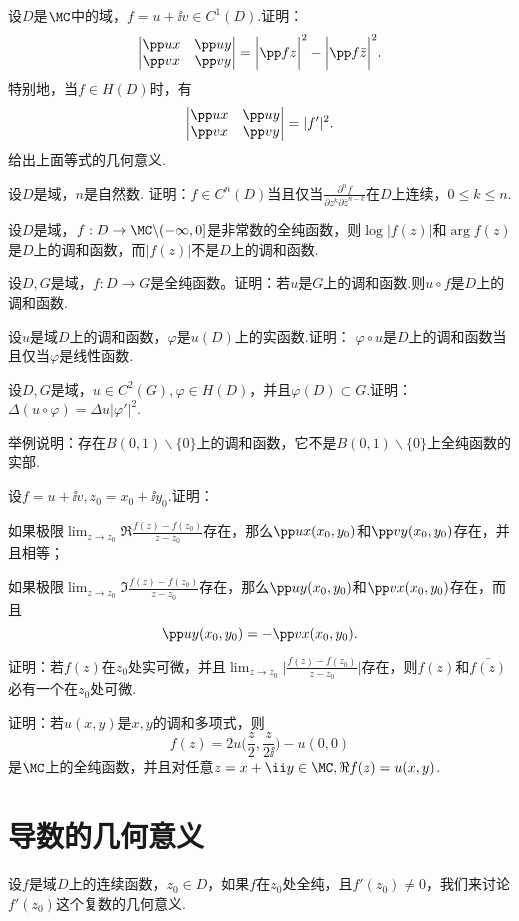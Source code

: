 \begin{xiti}
\item 设$D$是$\MC$中的域，$f=u+\ii v\in C^1(D)$.证明：
\[\begin{vmatrix}
\pp ux&\pp uy\\\pp vx&\pp vy
\end{vmatrix}=\bigg|\pp fz\bigg|^2-\bigg|\pp f{\bar z}\bigg|^2.\]
特别地，当$f\in H(D)$时，有
\[\begin{vmatrix}
\pp ux&\pp uy\\\pp vx&\pp vy
\end{vmatrix}=|f'|^2.\]
给出上面等式的几何意义.
\item 设$D$是域，$n$是自然数. 证明：$f\in C^n(D)$当且仅当$\frac{\partial^nf}{\partial z^k\partial\bar z^{n-k}}$在$D$上连续，$0\le k\le n$.
\item 设$D$是域，$f:D\to\MC\backslash(-\infty,0]$是非常数的全纯函数，则$\log |f(z)|$和$\arg f(z)$是$D$上的调和函数，而$|f(z)|$不是$D$上的调和函数.
\item 设$D,G$是域，$f:D\to G$是全纯函数。证明：若$u$是$G$上的调和函数.则$u\circ f$是$D$上的调和函数.
\item 设$u$是域$D$上的调和函数，$\varphi$是$u(D)$上的实函数.证明：
$\varphi\circ u$是$D$上的调和函数当且仅当$\varphi$是线性函数.
\item 设$D,G$是域，$u\in C^2(G),\varphi\in H(D)$，并且$\varphi(D)\subset G$.证明：$\Delta (u\circ \varphi)=\Delta u|\varphi'|^2$.
\item 举例说明：存在$B(0,1)\backslash\{0\}$上的调和函数，它不是$B(0,1)\backslash\{0\}$上全纯函数的实部.
\item 设$f=u+\ii v,z_0=x_0+\ii y_0$.证明：
\begin{enuma}
  \item 如果极限$\lim_{z\to z_0}\Re\frac{f(z)-f(z_0)}{z-z_0}$存在，那么$\pp ux(x_0,y_0)$和$\pp vy(x_0,y_0)$存在，并且相等；
  \item 如果极限$\lim_{z\to z_0}\Im\frac{f(z)-f(z_0)}{z-z_0}$存在，那么$\pp uy(x_0,y_0)$和$\pp vx(x_0,y_0)$存在，而且
      \[\pp uy(x_0,y_0)=-\pp vx(x_0,y_0).\]
\end{enuma}
\item 证明：若$f(z)$在$z_0$处实可微，并且$\lim_{z\to z_0}\bigg|\frac{f(z)-f(z_0)}{z-z_0}\bigg|$存在，则$f(z)$和$\bar{f(z)}$必有一个在$z_0$处可微.
\item 证明：若$u(x,y)$是$x,y$的调和多项式，则
\[f(z)=2u\bigg(\frac z2,\frac z{2\ii}\bigg)-u(0,0)\]
是$\MC$上的全纯函数，并且对任意$z=x+\ii y\in\MC,\Re f(z)=u(x,y)$.
\end{xiti}

\section{导数的几何意义\label{sec2.3}}
设$f$是域$D$上的连续函数，$z_0\in D$，如果$f$在$z_0$处全纯，且$f'(z_0)\ne0$，我们来讨论$f'(z_0)$这个复数的几何意义.

